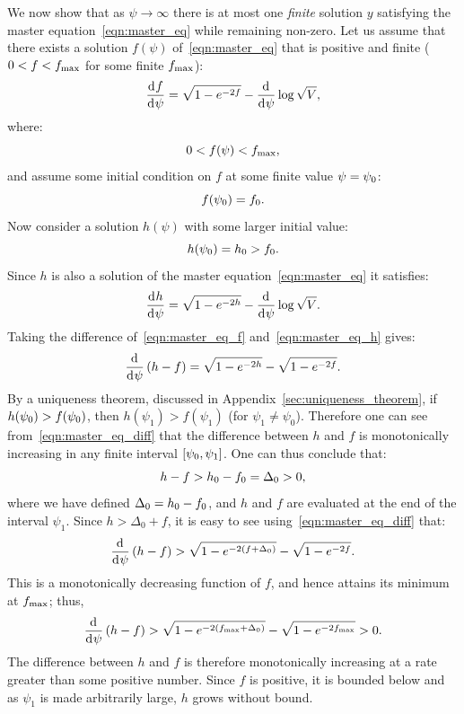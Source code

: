 We now show that as \(\psi\to\infty\) there is at most one {\em finite\/} solution \(y\) satisfying the master equation~\eqref{eqn:master_eq} while remaining non-zero.
Let us assume that there exists a solution \(f(\psi)\) of~\eqref{eqn:master_eq} that is positive and finite (\(0<f<f_\mathrm{max}\) for some finite \(f_\mathrm{max}\)):
\begin{equation}
  \frac{\operatorname{d}^{}\!{f}}{\operatorname{d}^{}\!{\psi}} = \sqrt{1-e^{-2f}} -\frac{\operatorname{d}^{}\!{}}{\operatorname{d}^{}\!{\psi}}\log \sqrt V,
  \label{eqn:master_eq_f}
\end{equation}
where:
\begin{equation}
  0<f(\psi)<f_\mathrm{max},
\end{equation}
and assume some initial condition on \(f\) at some finite value
\(\psi=\psi_0\):
\begin{equation}
  f(\psi_0)=f_0.
\end{equation}
Now consider a solution \(h(\psi)\) with some larger initial value:
\begin{equation}
  h(\psi_0)=h_0>f_0.
\end{equation}
Since \(h\) is also a solution of the master equation~\eqref{eqn:master_eq} it satisfies:
\begin{equation}
  \frac{\operatorname{d}^{}\!{h}}{\operatorname{d}^{}\!{\psi}} = \sqrt{1-e^{-2h}} -\frac{\operatorname{d}^{}\!{}}{\operatorname{d}^{}\!{\psi}}\log \sqrt V.
  \label{eqn:master_eq_h}
\end{equation}
Taking the difference of~\eqref{eqn:master_eq_f} and~\eqref{eqn:master_eq_h} gives:
\begin{equation}
  \frac{\operatorname{d}^{}\!{}}{\operatorname{d}^{}\!{\psi}}\left(h-f\right)
  = 
  \sqrt{1-e^{-2h}}-\sqrt{1-e^{-2f}}.
  \label{eqn:master_eq_diff}
\end{equation}
By a uniqueness theorem, discussed in Appendix~\ref{sec:uniqueness_theorem}, if \(h(\psi_0)>f(\psi_0)\), then \(h(\psi_1)>f(\psi_1)\) (for \(\psi_1\ne\psi_0\)). Therefore one can see from~\eqref{eqn:master_eq_diff} that the difference between \(h\) and \(f\) is monotonically increasing in any finite interval \([\psi_0,\psi_1]\).  One can thus conclude that:
\begin{equation}
  h-f>h_0-f_0=\Delta_0>0,
  \label{eqn:cosh_rel}
\end{equation}
where we have defined \(\Delta_0 = h_0-f_0\), and \(h\) and \(f\) are evaluated at the end of the interval \(\psi_1\). Since \(h>\Delta_0+f\), it is easy to see using~\eqref{eqn:master_eq_diff} that:
\begin{equation}
  \frac{\operatorname{d}^{}\!{}}{\operatorname{d}^{}\!{\psi}}\left(h-f\right)
  > 
  \sqrt{1-e^{-2(f+\Delta_0)}}-\sqrt{1-e^{-2f}}.
\end{equation}
This is a monotonically decreasing function of \(f\), and hence attains its minimum at \(f_\mathrm{max}\); thus,
\begin{equation}
  \frac{\operatorname{d}^{}\!{}}{\operatorname{d}^{}\!{\psi}}\left(h-f\right)
  > 
  \sqrt{1-e^{-2(f_\mathrm{max}+\Delta_0)}}-\sqrt{1-e^{-2f_\mathrm{max}}} 
  >
  0.
\end{equation}
The difference between \(h\) and \(f\) is therefore monotonically increasing at a rate greater than some positive number. Since \(f\) is positive, it is bounded below and as \(\psi_1\) is made arbitrarily large, \(h\) grows without bound.

